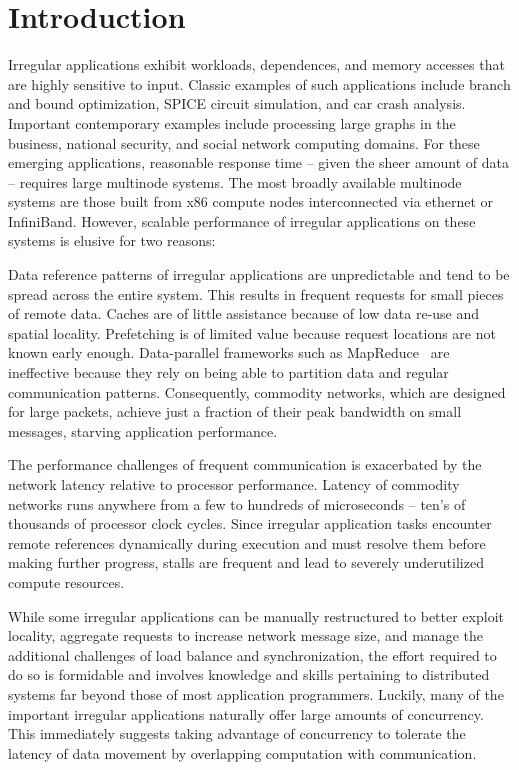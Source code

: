 \section{Introduction} \label{sec:intro}

Irregular applications exhibit workloads, dependences, and memory accesses
that are highly sensitive to input. Classic examples of such applications
include branch and bound optimization, SPICE circuit simulation, and car crash
analysis. Important contemporary examples include processing large graphs in
the business, national security, and social network computing domains. For
these emerging applications, reasonable response time -- given the sheer
amount of data -- requires large multinode systems. The most broadly available
multinode systems are those built from x86 compute nodes interconnected via
ethernet or InfiniBand. However, scalable performance of irregular
applications on these systems is elusive for two reasons:

\vspace{0.5ex}
 Data reference patterns of irregular applications are unpredictable and tend to be spread across the entire system. This results in frequent requests for small pieces of remote data. Caches are of little assistance because of low data re-use and spatial locality. Prefetching is of limited value because request locations are not known early enough. Data-parallel frameworks such as MapReduce~\cite{mapreduce:osdi04} are ineffective because they rely on being able to partition data and regular communication patterns. Consequently, commodity networks, which are designed for large packets, achieve just a fraction of their peak bandwidth on small messages, starving application performance.

\vspace{0.5ex}  The performance challenges of frequent communication is exacerbated by the network latency relative to processor performance. Latency of commodity networks runs anywhere from a few to hundreds of microseconds -- ten's of thousands of processor clock cycles.  Since irregular application tasks encounter remote references dynamically during execution and must resolve them before making further progress, stalls are frequent and lead to severely underutilized compute resources.

While some irregular applications can be manually restructured to better exploit locality, aggregate requests to increase network message size, and manage the additional challenges of load balance and synchronization, the effort required to do so is formidable and involves knowledge and skills pertaining to distributed systems far beyond those of most application programmers. Luckily, many of the important irregular applications naturally offer large amounts of concurrency. This immediately suggests taking advantage of concurrency to tolerate the latency of data movement by overlapping computation with communication.


